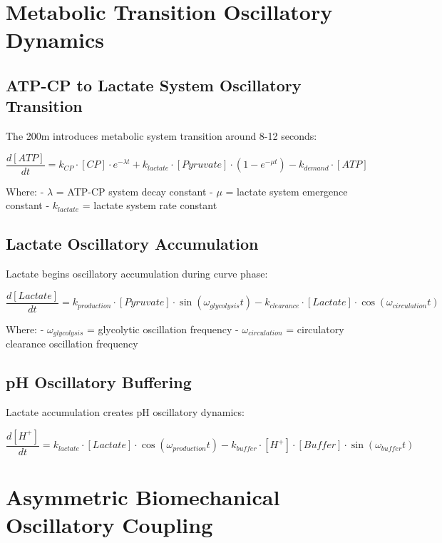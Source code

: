 \documentclass[12pt]{article}
\begin{document}
\section{Metabolic Transition Oscillatory Dynamics}

\subsection{ATP-CP to Lactate System Oscillatory Transition}

The 200m introduces metabolic system transition around 8-12 seconds:

\begin{equation}
\frac{d[ATP]}{dt} = k_{CP} \cdot [CP] \cdot e^{-\lambda t} + k_{lactate} \cdot [Pyruvate] \cdot \left(1 - e^{-\mu t}\right) - k_{demand} \cdot [ATP]
\end{equation}

Where:
- $\lambda$ = ATP-CP system decay constant
- $\mu$ = lactate system emergence constant  
- $k_{lactate}$ = lactate system rate constant

\subsection{Lactate Oscillatory Accumulation}

Lactate begins oscillatory accumulation during curve phase:

\begin{equation}
\frac{d[Lactate]}{dt} = k_{production} \cdot [Pyruvate] \cdot \sin(\omega_{glycolysis}t) - k_{clearance} \cdot [Lactate] \cdot \cos(\omega_{circulation}t)
\end{equation}

Where:
- $\omega_{glycolysis}$ = glycolytic oscillation frequency
- $\omega_{circulation}$ = circulatory clearance oscillation frequency

\subsection{pH Oscillatory Buffering}

Lactate accumulation creates pH oscillatory dynamics:

\begin{equation}
\frac{d[H^+]}{dt} = k_{lactate} \cdot [Lactate] \cdot \cos(\omega_{production}t) - k_{buffer} \cdot [H^+] \cdot [Buffer] \cdot \sin(\omega_{buffer}t)
\end{equation}

\section{Asymmetric Biomechanical Oscillatory Coupling}
\end{document}
